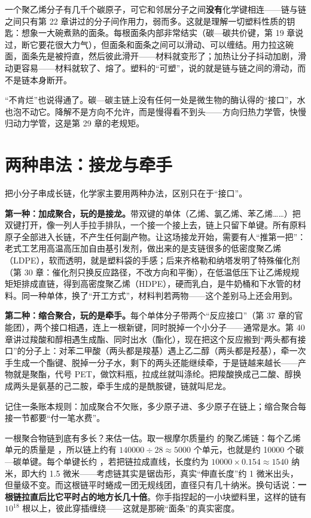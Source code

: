 一个聚乙烯分子有几千个碳原子，可它和邻居分子之间\textbf{没有}化学键相连——链与链之间只有第 22 章讲过的分子间作用力，弱而多。这就是理解一切塑料性质的钥匙：想象一大碗煮熟的面条。每根面条内部非常结实（碳—碳共价键，第 19 章说过，断它要花很大力气），但面条和面条之间可以滑动、可以缠结。用力拉这碗面，面条先是被捋直，然后彼此滑开——材料就变形了；加热让分子抖动加剧，滑动更容易——材料就软了、熔了。塑料的“可塑”，说的就是链与链之间的滑动，而不是链本身断开。

“不肯烂”也说得通了。碳—碳主链上没有任何一处是微生物的酶认得的“接口”，水也泡不动它。降解不是方向不允许，而是慢得看不到头——方向归热力学管，快慢归动力学管，这是第 29 章的老规矩。

\section{两种串法：接龙与牵手}

把小分子串成长链，化学家主要用两种办法，区别只在于“接口”。

\textbf{第一种：加成聚合，玩的是接龙。}带双键的单体（乙烯、氯乙烯、苯乙烯……）把双键打开，像一列人手拉手排队，一个接一个接上去，链上只留下单键。所有原料原子全部进入长链，不产生任何副产物。让这场接龙开始，需要有人“推第一把”：老式工艺用高温高压加自由基引发剂，做出来的是支链很多的低密度聚乙烯（LDPE），软而透明，就是塑料袋的手感；后来齐格勒和纳塔发明了特殊催化剂（第 30 章：催化剂只换反应路径，不改方向和平衡），在低温低压下让乙烯规规矩矩排成直链，得到高密度聚乙烯（HDPE），硬而乳白，是牛奶桶和下水管的材料。同一种单体，换了“开工方式”，材料判若两物——这个差别马上还会用到。

\textbf{第二种：缩合聚合，玩的是牵手。}每个单体分子带两个“反应接口”（第 37 章的官能团），两个接口相遇，连上一根新键，同时脱掉一个小分子——通常是水。第 40 章讲过羧酸和醇相遇生成酯、同时出水（酯化），现在把这个反应搬到“两头都有接口”的分子上：对苯二甲酸（两头都是羧基）遇上乙二醇（两头都是羟基），牵一次手生成一个酯键、脱掉一分子水，剩下的两头还能继续牵，于是链越来越长——产物就是聚酯，代号 PET，做饮料瓶，拉成丝就叫涤纶。把羧酸换成己二酸、醇换成两头是氨基的己二胺，牵手生成的是酰胺键，链就叫尼龙。

记住一条账本规则：加成聚合不欠账，多少原子进、多少原子在链上；缩合聚合每接一节都要“付一笔水费”。

\begin{qiaoliang}
一根聚合物链到底有多长？来估一估。取一根摩尔质量约  的聚乙烯链：每个乙烯单元的质量是 ，所以链上约有 $140000\div 28\approx 5000$ 个单元，也就是约 10000 个碳—碳单键。每个单键长约 ，若把链拉成直线，长度约为 $10000\times 0.154\approx 1540$ 纳米，即大约 1.5 微米——考虑链其实是锯齿形，真实“伸直长度”约 1 微米出头，但量级不变。而这根链平时蜷成一团无规线团，直径只有几十纳米。换句话说：\textbf{一根链拉直后比它平时占的地方长几十倍}。你手指捏起的一小块塑料里，这样的链有 $10^{18}$ 根以上，彼此穿插缠绕——这就是那碗“面条”的真实密度。
\end{qiaoliang}

